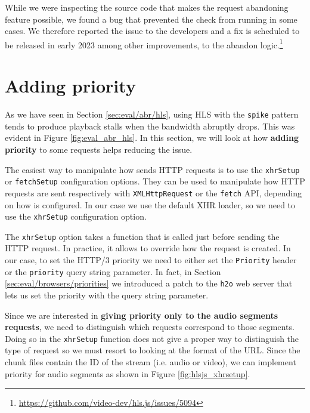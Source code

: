 While we were inspecting the source code that makes the request abandoning feature possible, we found a bug that prevented the check from running in some cases. We therefore reported the issue to the \hlsjs{} developers and a fix is scheduled to be released in early 2023 among other improvements, to the abandon logic.\footnote{\url{https://github.com/video-dev/hls.js/issues/5094}}

\section{Adding priority}
\label{sec:improvements/priority}

As we have seen in Section \ref{sec:eval/abr/hls}, using HLS with the \texttt{spike} pattern tends to produce playback stalls when the bandwidth abruptly drops. This was evident in Figure \ref{fig:eval_abr_hls}. In this section, we will look at how \textbf{adding priority} to some requests helps reducing the issue.

The easiest way to manipulate how \hlsjs{} sends HTTP requests is to use the \texttt{xhrSetup} or \texttt{fetchSetup} configuration options. They can be used to manipulate how HTTP requests are sent respectively with \texttt{XMLHttpRequest} or the \texttt{fetch} API, depending on how \hlsjs{} is configured. In our case we use the default XHR loader, so we need to use the \texttt{xhrSetup} configuration option.

The \texttt{xhrSetup} option takes a function that is called just before sending the HTTP request. In practice, it allows to override how the request is created. In our case, to set the HTTP/3 priority we need to either set the \texttt{Priority} header or the \texttt{priority} query string parameter. In fact, in Section \ref{sec:eval/browsers/priorities} we introduced a patch to the \texttt{h2o} web server that lets us set the priority with the query string parameter.

Since we are interested in \textbf{giving priority only to the audio segments requests}, we need to distinguish which requests correspond to those segments. Doing so in the \texttt{xhrSetup} function does not give a proper way to distinguish the type of request so we must resort to looking at the format of the URL. Since the chunk files contain the ID of the stream (i.e. audio or video), we can implement priority for audio segments as shown in Figure \ref{fig:hlsjs_xhrsetup}.

